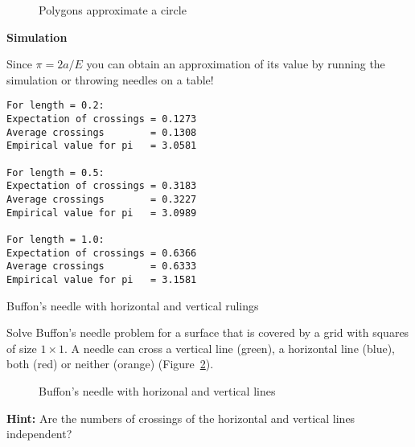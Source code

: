\begin{figure}[bt]
\begin{center}
\end{center}
\caption{Polygons approximate a circle}\label{f.buffon4}
\end{figure}

\textbf{Simulation}

Since $\pi=2a/E$ you can obtain an approximation of its value by running the simulation or throwing needles on a table!

\begin{verbatim}
For length = 0.2:
Expectation of crossings = 0.1273
Average crossings        = 0.1308
Empirical value for pi   = 3.0581

For length = 0.5:
Expectation of crossings = 0.3183
Average crossings        = 0.3227
Empirical value for pi   = 3.0989

For length = 1.0:
Expectation of crossings = 0.6366
Average crossings        = 0.6333
Empirical value for pi   = 3.1581
\end{verbatim}


\begin{prob}{Buffon's needle with horizontal and vertical rulings}

Solve Buffon's needle problem for a surface that is covered by a grid with squares of size $1\times 1$. A needle can cross a vertical line (green), a horizontal line (blue), both (red) or neither (orange) (Figure~\ref{f.buffon5}).

\begin{figure}[b]
\begin{center}
\end{center}
\caption{Buffon's needle with horizonal and vertical lines}\label{f.buffon5}
\end{figure}

\textbf{Hint:} Are the numbers of crossings of the horizontal and vertical lines independent?

\end{prob}

